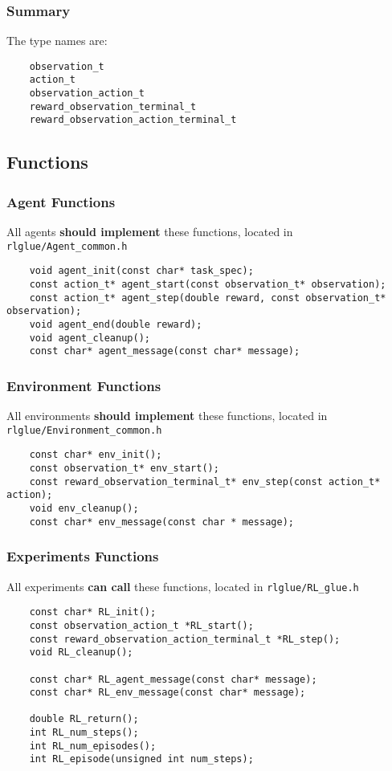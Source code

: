 \documentclass[11pt]{article}
\begin{document}
\subsubsection{Summary}
The type names are:
\begin{verbatim}
    observation_t
    action_t
    observation_action_t
    reward_observation_terminal_t
    reward_observation_action_terminal_t
\end{verbatim}


\subsection{Functions}
\subsubsection{Agent Functions}
All agents \textbf{should implement} these functions, located in \texttt{rlglue/Agent\_common.h}
\begin{verbatim}
	void agent_init(const char* task_spec);
	const action_t* agent_start(const observation_t* observation);
	const action_t* agent_step(double reward, const observation_t* observation);
	void agent_end(double reward);  
	void agent_cleanup();
	const char* agent_message(const char* message);
\end{verbatim}

\subsubsection{Environment Functions}
All environments \textbf{should implement} these functions, located in \texttt{rlglue/Environment\_common.h}
\begin{verbatim}
	const char* env_init();
	const observation_t* env_start();
	const reward_observation_terminal_t* env_step(const action_t* action);
	void env_cleanup();
	const char* env_message(const char * message);
\end{verbatim}

\subsubsection{Experiments Functions}
All experiments \textbf{can call} these functions, located in \texttt{rlglue/RL\_glue.h}
\begin{verbatim}
	const char* RL_init();
	const observation_action_t *RL_start();
	const reward_observation_action_terminal_t *RL_step();
	void RL_cleanup();

	const char* RL_agent_message(const char* message);
	const char* RL_env_message(const char* message);

	double RL_return();
	int RL_num_steps();
	int RL_num_episodes();
	int RL_episode(unsigned int num_steps);
\end{verbatim}
\end{document}
